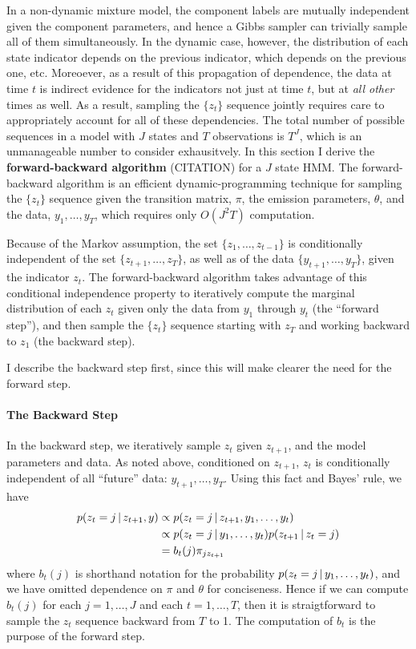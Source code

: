 In a non-dynamic mixture model, the component labels are mutually
independent given the component parameters, and hence a Gibbs sampler
can trivially sample all of them simultaneously.  In the dynamic case,
however, the distribution of each state indicator depends on the
previous indicator, which depends on the previous one, etc.
Moreoever, as a result of this propagation of dependence, the data at
time $t$ is indirect evidence for the indicators not just at time $t$,
but at {\em all other} times as well.  As a result,
sampling the $\{z_t\}$ sequence jointly requires care to appropriately
account for all of these dependencies.  The total number of possible
sequences in a model with $J$ states and $T$ observations is $T^J$,
which is an unmanageable number to consider exhausitvely.  In this section I derive the
{\bf forward-backward algorithm} (CITATION) for a $J$ state HMM.
The forward-backward algorithm is an efficient dynamic-programming
technique for sampling the $\{z_t\}$ sequence given the transition
matrix, $\pi$, the emission parameters, $\theta$, and the data, 
$y_1, \dots, y_T$, which requires only $O(J^2 T)$ computation.

Because of the Markov assumption, the set $\{z_1, \dots,
z_{t-1}\}$ is conditionally independent of the set $\{z_{t+1}, \dots,
z_{T}\}$, as well as of the data $\{y_{t+1}, \dots, y_{T}\}$, given
the indicator $z_t$.  The forward-backward algorithm
takes advantage of this conditional independence property to
iteratively compute the marginal distribution of each $z_t$ 
given only the data from $y_1$ through $y_t$ (the ``forward step''), 
and then sample the $\{z_t\}$ sequence starting with $z_T$ and working
backward to $z_1$ (the backward step).

I describe the backward step first, since this will make clearer the
need for the forward step.

\paragraph{The Backward Step}
In the backward step, we iteratively sample $z_t$ given $z_{t+1}$, and
the model parameters and data.  As noted above, conditioned on
$z_{t+1}$, $z_{t}$ is conditionally independent of all ``future''
data: $y_{t+1}, \dots, y_T$.  Using this fact and Bayes' rule, we have
\begin{align}
  p(z_{t}  = j \, \vert \, z_{t+1}, y) &\propto p(z_t  = j \, \vert \, z_{t+1}, y_1,
  \dots, y_t) \\
  &\propto p(z_t = j \, \vert \, y_1, \dots, y_t) p(z_{t+1} \, \vert \, z_t = j) \\
  &= b_t(j) \pi_{jz_{t+1}}
\end{align}
where $b_t(j)$ is shorthand notation for the probability
$p(z_t = j \, \vert \, y_1, \dots, y_t)$, and we have omitted dependence on
$\pi$ and $\theta$ for conciseness.  Hence if we can compute $b_t(j)$
for each $j = 1, \dots, J$ and each $t = 1, \dots, T$, then it is
straigtforward to sample the $z_t$ sequence backward from $T$ to 1.
The computation of $b_t$ is the purpose of the forward step.

